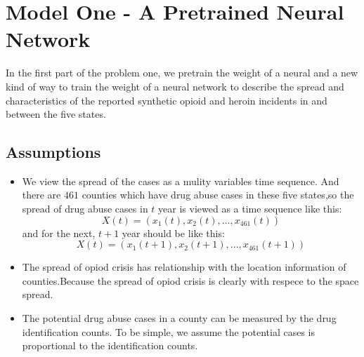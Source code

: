 \documentclass{mcmthesis}
\begin{document}
\section{Model One - A Pretrained Neural Network}
	\par In the first part of the problem one, we pretrain the weight of a neural and a new kind of way to train the weight of a neural network to describe the spread and characteristics of the reported synthetic opioid and heroin incidents in and between the five states. 
	\subsection{Assumptions}
		\begin{itemize}
			\item We view the spread of the cases as a mulity variables time sequence. And there are $461$ counties which have drug abuse cases in these five states,so the spread of drug abuse cases in $t$ year is viewed as a time sequence like this: 
				$$X(t) = ( x_{1}(t), x_{2}(t), ..., x_{461}(t) )$$
				and for the next,  $t+1$ year should be like this:
				$$X(t) = ( x_{1}(t+1), x_{2}(t+1), ..., x_{461}(t+1) )$$
			\item The spread of opiod crisis has relationship with the location information of counties.Because the spread of opiod crisis is clearly with respece to the space spread.
			\item The potential drug abuse cases in a county can be measured by the drug identification counts. To be simple, we assume the potential cases is proportional to the identification counts. 
		\end{itemize}
\end{document}
